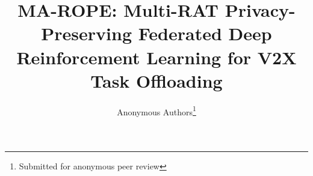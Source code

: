 \documentclass[journal,10pt,twocolumn]{IEEEtran}
\begin{document}
\title{MA-ROPE: Multi-RAT Privacy-Preserving Federated Deep Reinforcement Learning for V2X Task Offloading}
\author{Anonymous Authors\thanks{Submitted for anonymous peer review}}

\maketitle













\end{document}
